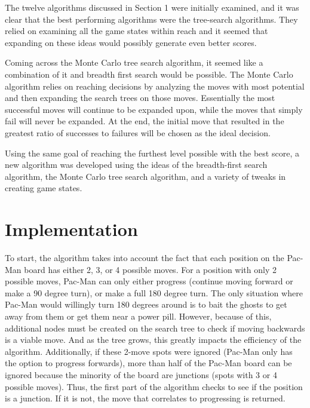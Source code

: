 \documentclass[a4paper,oneside,10pt]{report}
\begin{document}
The twelve algorithms discussed in Section 1 were initially examined, and it was clear that the best performing algorithms were the tree-search algorithms. They relied on examining all the game states within reach and it seemed that expanding on these ideas would possibly generate even better scores. 

Coming across the Monte Carlo tree search algorithm, it seemed like a combination of it and breadth first search would be possible. The Monte Carlo algorithm relies on reaching decisions by analyzing the moves with most potential and then expanding the search trees on those moves. Essentially the most successful moves will continue to be expanded upon, while the moves that simply fail will never be expanded. At the end, the initial move that resulted in the greatest ratio of successes to failures will be chosen as the ideal decision. 

Using the same goal of reaching the furthest level possible with the best score, a new algorithm was developed using the ideas of the breadth-first search algorithm, the Monte Carlo tree search algorithm, and a variety of tweaks in creating game states. 

\section {Implementation} \label{custImp}

To start, the algorithm takes into account the fact that each position on the Pac-Man board has either 2, 3, or 4 possible moves. For a position with only 2 possible moves, Pac-Man can only either progress (continue moving forward or make a 90 degree turn), or make a full 180 degree turn. The only situation where Pac-Man would willingly turn 180 degrees around is to bait the ghosts to get away from them or get them near a power pill. However, because of this, additional nodes must be created on the search tree to check if moving backwards is a viable move. And as the tree grows, this greatly impacts the efficiency of the algorithm. Additionally, if these 2-move spots were ignored (Pac-Man only has the option to progress forwards), more than half of the Pac-Man board can be ignored because the minority of the board are junctions (spots with 3 or 4 possible moves). Thus, the first part of the algorithm checks to see if the position is a junction. If it is not, the move that correlates to progressing is returned.
\end{document}
